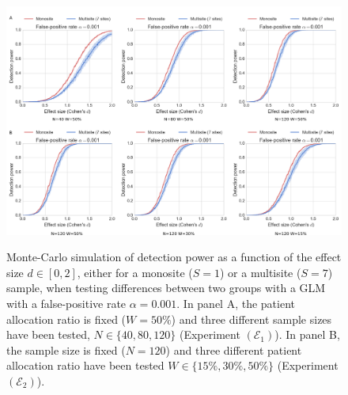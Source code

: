 \documentclass[authoryear]{elsarticle}
\begin{document}
\begin{figure}[tbp]
\centering
\captionsetup[subfloat]{labelformat=empty}
{\includegraphics[width=\textwidth]{../figures/simulations_real_7sites.png}}

\caption{
Monte-Carlo simulation of detection power as a function of the effect size $d\in[0,2]$, either for a monosite ($S=1$) or a multisite ($S=7$) sample, when testing differences between two groups with a GLM with a false-positive rate $\alpha=0.001$. In panel A, the patient allocation ratio is fixed ($W=50\%$) and three different sample sizes have been tested, $N\in\{40, 80, 120\}$ (Experiment $(\mathcal{E}_1)$). In panel B, the sample size is fixed ($N=120$) and three different patient allocation ratio have been tested $W\in \{15\%, 30\%,50\%\}$ (Experiment $(\mathcal{E}_2)$).
}
\label{fig_real_sim}
\end{figure}
\end{document}
